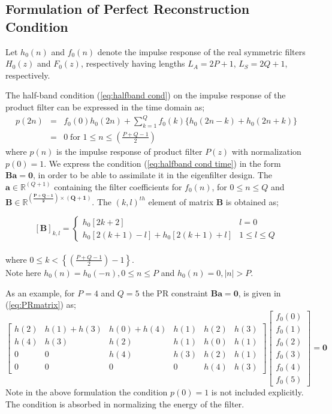 \subsection{\label{sub:perfect-reconstruction-condition}Formulation of Perfect Reconstruction Condition}
Let $h_{0}(n)$ and $f_{0}(n)$ denote the impulse response of the
real symmetric filters $H_{0}(z)$ and $F_{0}(z)$, respectively having
lengths $L_{A}=2P+1$, $L_{S}=2Q+1$, respectively.

The half-band condition (\ref{eq:halfband cond}) on the impulse response
of the product filter can be expressed in the time domain as;
\begin{eqnarray}
p(2n) &=& f_{0}(0)h_{0}(2n)+\sum_{k=1}^{Q}{\displaystyle f_{0}(k)\{h_{0}(2n-k)+h_{0}(2n+k)\}} \nonumber \\
&=&0 \; \mbox{for }1\leq n\leq\left(\frac{P+Q-1}{2}\right)\label{eq:halfband cond time}
\end{eqnarray}
where $p(n)$ is the impulse response of product filter $P(z)$ with
normalization $p(0)=1$. We express the condition (\ref{eq:halfband cond time})
in the form $\mathbf{B}\mathbf{a}=\mathbf{0}$, in order to be able
to assimilate it in the eigenfilter design. The $\mathbf{a}\in\mathbb{R}^{(Q+1)}$ containing the filter coefficients
for $f_{0}(n)$, for $0\leq n\leq Q$ and $ \mathbf{B\in\mathbb{R}^{\left(\frac{P+Q-1}{2}\right)\times(Q+1)}} $. The $(k,l)^{th}$ element of
matrix $\mathbf{B}$ is obtained as;

\begin{equation}
\label{eq:MatrixB}
[\mathbf{B}]_{k,l}=\begin{cases}
h_{0}[2k+2] & l=0 \\
h_{0}[2(k+1)-l]+h_{0}[2(k+1)+l] & 1\le l\le Q
\end{cases}
\end{equation}\\
where $0\leq k<\left\{\left(\frac{P+Q-1}{2}\right)-1 \right\}$.\\
Note here $h_{0}(n)=h_{0}(-n), 0 \le n \le P$ and $h_{0}(n)=0, |n|>P$.

As an example, for $P=4$ and $Q=5$ the PR constraint $\mathbf{B}\mathbf{a}=\mathbf{0}$,
is given in (\ref{eq:PRmatrix}) as;
\begin{equation}
\label{eq:PRmatrix}
\left[\begin{array}{cccccc}
h(2) & h(1)+h(3) & h(0)+h(4) & h(1) & h(2) & h(3)\\
h(4) & h(3) & h(2) & h(1) & h(0) & h(1)\\
0 & 0 & h(4) & h(3) & h(2) & h(1)\\
0 & 0 & 0 & 0 & h(4) & h(3)
\end{array}\right]\left[\begin{array}{c}
f_{0}(0)\\
f_{0}(1)\\
f_{0}(2)\\
f_{0}(3)\\
f_{0}(4)\\
f_{0}(5)
\end{array}\right]=\mathbf{0}
\end{equation}
Note in the above formulation the condition $p(0)=1$ is not included explicitly.
The condition is absorbed in normalizing the energy of the filter.

